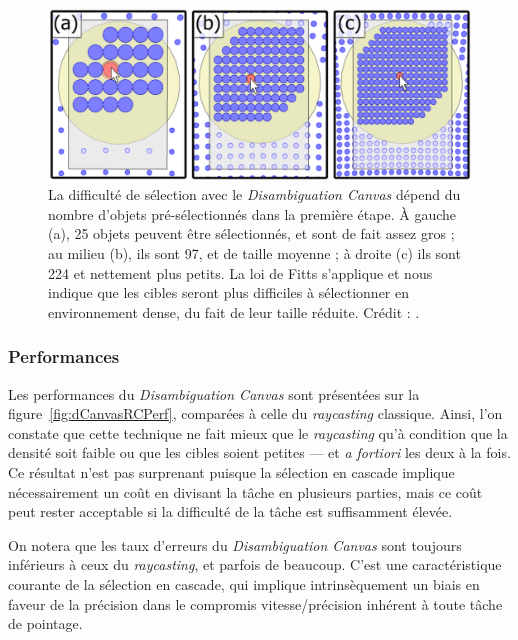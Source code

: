 	\begin{figure}[ht]
		\centering
		\includegraphics[width=\textwidth]{figures/ch2/dCanvasDensity}
		\caption[\emph{Disambiguation Canvas} -- densité]{La difficulté de sélection avec le \emph{Disambiguation Canvas} dépend du nombre d'objets pré-sélectionnés dans la première étape. À gauche (a), 25 objets peuvent être sélectionnés, et sont de fait assez gros ; au milieu (b), ils sont 97, et de taille moyenne ; à droite (c) ils sont 224 et nettement plus petits. La loi de Fitts s'applique et nous indique que les cibles seront plus difficiles à sélectionner en environnement dense, du fait de leur taille réduite. Crédit : \cite{debarba2013disambiguation}.}
		\label{fig:dCanvasDensity}
	\end{figure}
	
	\subsubsection{Performances}
	Les performances du \emph{Disambiguation Canvas} sont présentées sur la figure~\ref{fig:dCanvasRCPerf}, comparées à celle du \emph{raycasting} classique. Ainsi, l'on constate que cette technique ne fait mieux que le \emph{raycasting} qu'à condition que la densité soit faible ou que les cibles soient petites --- et \emph{a fortiori} les deux à la fois. Ce résultat n'est pas surprenant puisque la sélection en cascade implique nécessairement un coût en divisant la tâche en plusieurs parties, mais ce coût peut rester acceptable si la difficulté de la tâche est suffisamment élevée.
	
	On notera que les taux d'erreurs du \emph{Disambiguation Canvas} sont toujours inférieurs à ceux du \emph{raycasting}, et parfois de beaucoup. C'est une caractéristique courante de la sélection en cascade, qui implique intrinsèquement un biais en faveur de la précision dans le compromis vitesse/précision inhérent à toute tâche de pointage.
	
